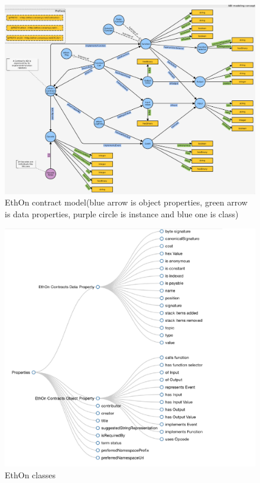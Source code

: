 \begin{center}
	
	\begin{figure}[htb!]
		
		\begin{minipage}{0.50\linewidth}
			\centering
			\includegraphics[width=1.80\textwidth]{images/chap2_EthOnContract.png}
		\end{minipage}
		\caption[EthOn classes]{EthOn contract model(blue arrow is object properties, green arrow is data properties, purple circle is instance and blue one is class) \cite{Rashid}}
		
	\end{figure}
	
	\begin{figure}[htb!]
		
		\begin{minipage}{0.55\linewidth}
			\centering
			\includegraphics[width=1.65\textwidth]{images/chap02_EthOn_Properties.png}
		\end{minipage}
		\caption[EthOn Properties]{EthOn classes \cite{Rashid}}
		

\end{figure}
\end{center}
